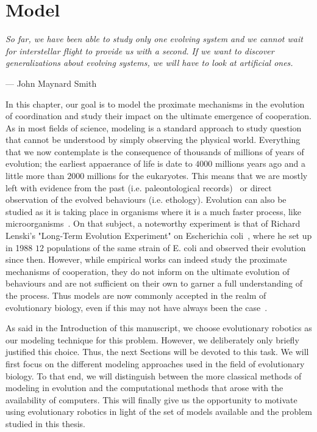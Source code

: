 \chapter{Model}
\label{chapter:model}

\epigraph{\textit{So far, we have been able to study only one evolving system and we cannot wait for interstellar flight to provide us with a second. If we want to discover generalizations about evolving systems, we will have to look at artificial ones.}}{--- \textup{John Maynard Smith}}

\minitoc[n] %

In this chapter, our goal is to model the proximate mechanisms in the evolution of coordination and study their impact on the ultimate emergence of cooperation. As in most fields of science, modeling is a standard approach to study question that cannot be understood by simply observing the physical world. Everything that we now contemplate is the consequence of thousands of millions of years of evolution; the earliest appaerance of life is date to $4000$ millions years ago and a little more than $2000$ millions for the eukaryotes. This means that we are mostly left with evidence from the past (i.e. paleontological records)~\parencite{Aiello1995, Wrangham1999} or direct observation of the evolved behaviours (i.e. ethology). Evolution can also be studied as it is taking place in organisms where it is a much faster process, like microorganisms~\parencite{Elena2003}. On that subject, a noteworthy experiment is that of Richard Lenski's "Long-Term Evolution Experiment" on Escherichia coli~\parencite{Fox2015}, where he set up in 1988 $12$ populations of the same strain of E. coli and observed their evolution since then. However, while empirical works can indeed study the proximate mechanisms of cooperation, they do not inform on the ultimate evolution of behaviours and are not sufficient on their own to garner a full understanding of the process. Thus models are now commonly accepted in the realm of evolutionary biology, even if this may not have always been the case~\parencite{Shou2015}. 

As said in the Introduction of this manuscript, we choose evolutionary robotics as our modeling technique for this problem. However, we deliberately only briefly justified this choice. Thus, the next Sections will be devoted to this task. We will first focus on the different modeling approaches used in the field of evolutionary biology. To that end, we will distinguish between the more classical methods of modeling in evolution and the computational methods that arose with the availability of computers. This will finally give us the opportunity to motivate using evolutionary robotics in light of the set of models available and the problem studied in this thesis.



